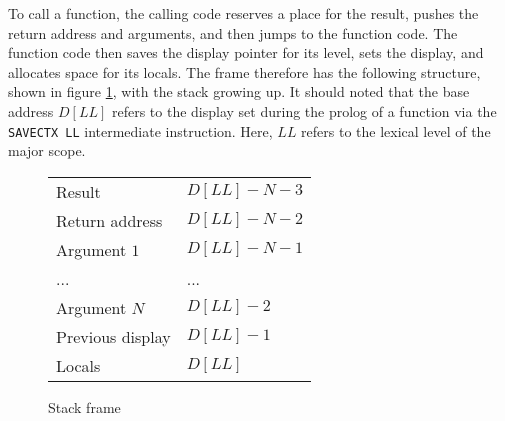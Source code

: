 \documentclass[oneside]{amsart}
\theoremstyle{definition}
\theoremstyle{remark}
\numberwithin{equation}{section}
\begin{document}
To call a function, the calling code reserves a place for the result, pushes the return address and
arguments, and then jumps to the function code. The function code then saves the display pointer for
its level, sets the display, and allocates space for its locals. The frame therefore has the
following structure, shown in figure \ref{fig:frame}, with the stack growing up. It should noted
that the base address $D[LL]$ refers to the display set during the prolog of a function via the
\texttt{SAVECTX LL} intermediate instruction. Here, $LL$ refers to the lexical level of the major
scope.

\begin{figure}[h]
\caption{Stack frame}
\begin{tabular}{l|l}
Result & $D[LL] - N - 3$ \\
Return address & $D[LL] - N - 2$  \\
Argument $1$ & $D[LL] - N - 1$  \\
... & ... \\
Argument $N$ & $D[LL] - 2$ \\
Previous display & $D[LL] - 1$ \\
Locals & $D[LL]$ \\
\end{tabular}
\label{fig:frame}
\end{figure}

\end{document}
